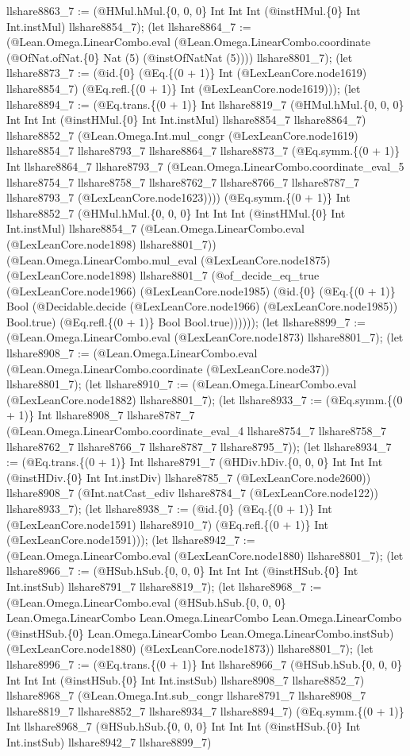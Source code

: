 \documentclass[11pt]{article}
\begin{document}
llshare8863\_7 := (@HMul.hMul.\{0, 0, 0\} Int Int Int (@instHMul.\{0\} Int Int.instMul) llshare8854\_7); (let llshare8864\_7 := (@Lean.Omega.LinearCombo.eval (@Lean.Omega.LinearCombo.coordinate (@OfNat.ofNat.\{0\} Nat (5) (@instOfNatNat (5)))) llshare8801\_7); (let llshare8873\_7 := (@id.\{0\} (@Eq.\{(0 + 1)\} Int (@LexLeanCore.node1619) llshare8854\_7) (@Eq.refl.\{(0 + 1)\} Int (@LexLeanCore.node1619))); (let llshare8894\_7 := (@Eq.trans.\{(0 + 1)\} Int llshare8819\_7 (@HMul.hMul.\{0, 0, 0\} Int Int Int (@instHMul.\{0\} Int Int.instMul) llshare8854\_7 llshare8864\_7) llshare8852\_7 (@Lean.Omega.Int.mul\_congr (@LexLeanCore.node1619) llshare8854\_7 llshare8793\_7 llshare8864\_7 llshare8873\_7 (@Eq.symm.\{(0 + 1)\} Int llshare8864\_7 llshare8793\_7 (@Lean.Omega.LinearCombo.coordinate\_eval\_5 llshare8754\_7 llshare8758\_7 llshare8762\_7 llshare8766\_7 llshare8787\_7 llshare8793\_7 (@LexLeanCore.node1623)))) (@Eq.symm.\{(0 + 1)\} Int llshare8852\_7 (@HMul.hMul.\{0, 0, 0\} Int Int Int (@instHMul.\{0\} Int Int.instMul) llshare8854\_7 (@Lean.Omega.LinearCombo.eval (@LexLeanCore.node1898) llshare8801\_7)) (@Lean.Omega.LinearCombo.mul\_eval (@LexLeanCore.node1875) (@LexLeanCore.node1898) llshare8801\_7 (@of\_decide\_eq\_true (@LexLeanCore.node1966) (@LexLeanCore.node1985) (@id.\{0\} (@Eq.\{(0 + 1)\} Bool (@Decidable.decide (@LexLeanCore.node1966) (@LexLeanCore.node1985)) Bool.true) (@Eq.refl.\{(0 + 1)\} Bool Bool.true)))))); (let llshare8899\_7 := (@Lean.Omega.LinearCombo.eval (@LexLeanCore.node1873) llshare8801\_7); (let llshare8908\_7 := (@Lean.Omega.LinearCombo.eval (@Lean.Omega.LinearCombo.coordinate (@LexLeanCore.node37)) llshare8801\_7); (let llshare8910\_7 := (@Lean.Omega.LinearCombo.eval (@LexLeanCore.node1882) llshare8801\_7); (let llshare8933\_7 := (@Eq.symm.\{(0 + 1)\} Int llshare8908\_7 llshare8787\_7 (@Lean.Omega.LinearCombo.coordinate\_eval\_4 llshare8754\_7 llshare8758\_7 llshare8762\_7 llshare8766\_7 llshare8787\_7 llshare8795\_7)); (let llshare8934\_7 := (@Eq.trans.\{(0 + 1)\} Int llshare8791\_7 (@HDiv.hDiv.\{0, 0, 0\} Int Int Int (@instHDiv.\{0\} Int Int.instDiv) llshare8785\_7 (@LexLeanCore.node2600)) llshare8908\_7 (@Int.natCast\_ediv llshare8784\_7 (@LexLeanCore.node122)) llshare8933\_7); (let llshare8938\_7 := (@id.\{0\} (@Eq.\{(0 + 1)\} Int (@LexLeanCore.node1591) llshare8910\_7) (@Eq.refl.\{(0 + 1)\} Int (@LexLeanCore.node1591))); (let llshare8942\_7 := (@Lean.Omega.LinearCombo.eval (@LexLeanCore.node1880) llshare8801\_7); (let llshare8966\_7 := (@HSub.hSub.\{0, 0, 0\} Int Int Int (@instHSub.\{0\} Int Int.instSub) llshare8791\_7 llshare8819\_7); (let llshare8968\_7 := (@Lean.Omega.LinearCombo.eval (@HSub.hSub.\{0, 0, 0\} Lean.Omega.LinearCombo Lean.Omega.LinearCombo Lean.Omega.LinearCombo (@instHSub.\{0\} Lean.Omega.LinearCombo Lean.Omega.LinearCombo.instSub) (@LexLeanCore.node1880) (@LexLeanCore.node1873)) llshare8801\_7); (let llshare8996\_7 := (@Eq.trans.\{(0 + 1)\} Int llshare8966\_7 (@HSub.hSub.\{0, 0, 0\} Int Int Int (@instHSub.\{0\} Int Int.instSub) llshare8908\_7 llshare8852\_7) llshare8968\_7 (@Lean.Omega.Int.sub\_congr llshare8791\_7 llshare8908\_7 llshare8819\_7 llshare8852\_7 llshare8934\_7 llshare8894\_7) (@Eq.symm.\{(0 + 1)\} Int llshare8968\_7 (@HSub.hSub.\{0, 0, 0\} Int Int Int (@instHSub.\{0\} Int Int.instSub) llshare8942\_7 llshare8899\_7) 
\end{document}
